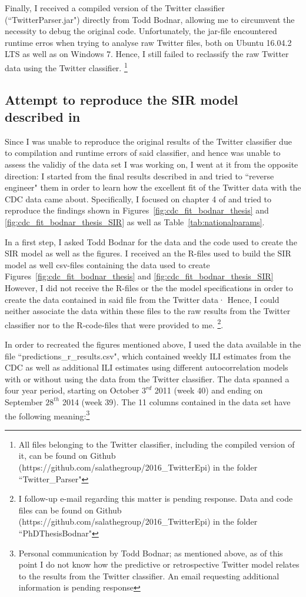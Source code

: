 \documentclass[11pt, a4paper,twoside]{report}\usepackage[]{graphicx}\usepackage[]{color}
\begin{document}
Finally, I received a compiled version of the Twitter classifier (``TwitterParser.jar") directly from Todd Bodnar, allowing me to circumvent the necessity to debug the original code.  Unfortunately, the jar-file encountered runtime erros when trying to analyse raw Twitter files, both on Ubuntu 16.04.2 LTS as well as on Windows 7. Hence, I still failed to reclassify the raw Twitter data using the Twitter classifier. \footnote{All files belonging to the Twitter classifier, including the compiled version of it, can be found on Github (https://github.com/salathegroup/2016\_TwitterEpi) in the folder ``Twitter\_Parser"}

\subsection{Attempt to reproduce the SIR model described in \citep{bodnar_data_2015}}
Since I was unable to reproduce the original results of the Twitter classifier due to compilation and runtime errors of said classifier, and hence was unable to assess the validiy of the data set I was working on, I went at it from the opposite direction: I started from the final results described in \citep{bodnar_data_2015} and tried to ``reverse engineer" them in order to learn how the excellent fit of the Twitter data with the CDC data came about. Specifically, I focused on chapter 4 of \citep{bodnar_data_2015} and tried to reproduce the findings shown in Figures~\ref{fig:cdc_fit_bodnar_thesis} and \ref{fig:cdc_fit_bodnar_thesis_SIR} as well as Table~\ref{tab:nationalparams}.\newline

In a first step, I asked Todd Bodnar for the data and the code used to create the SIR model as well as the figures. I received an the R-files used to build the SIR model as well csv-files containing the data used to create Figures~\ref{fig:cdc_fit_bodnar_thesis} and \ref{fig:cdc_fit_bodnar_thesis_SIR}  However, I did not receive the R-files or the the model specifications in order to create the data contained in said file from the Twitter data· Hence, I could neither associate the data within these files to the raw results from the Twitter classifier nor to the R-code-files that were provided to me. \footnote{I follow-up e-mail regarding this matter is pending response. Data and code files can be found on Github (https://github.com/salathegroup/2016\_TwitterEpi) in the folder ``PhDThesisBodnar"}.\newline

In order to recreated the figures mentioned above, I used the data available in the file ``predictions\_r\_results.csv", which contained weekly ILI estimates from the CDC as well as additional ILI estimates using different autocorrelation models with or without using the data from the Twitter classifier. The data spanned a four year period, starting on October $3^{rd}$ 2011 (week 40) and ending on September $28^{th}$ 2014 (week 39). The 11 columns contained in the data set have the following meaning:\footnote{Personal communication by Todd Bodnar; as mentioned above, as of this point I do not know how the predictive or retrospective Twitter model relates to the results from the Twitter classifier. An email requesting additional information is pending response}  
\end{document}
